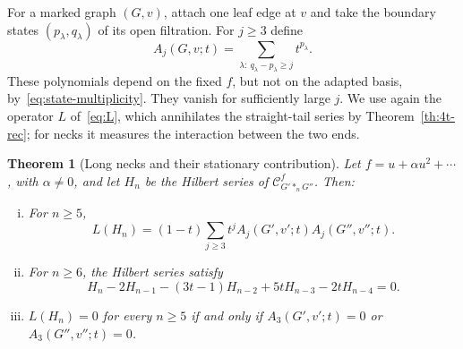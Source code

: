 \documentclass[reqno]{article}
\theoremstyle{plain} %
\newtheorem{theorem}{Theorem}[section]
\theoremstyle{definition}
\theoremstyle{remark}
\newcommand {\CC}{\mathscr{C}}
\numberwithin{equation}{section}
\begin{document}
For a marked graph \((G,v)\), attach one leaf edge at \(v\) and take
the boundary states \((p_\lambda,q_\lambda)\) of its open filtration.
For \(j\ge3\) define
\begin{equation}
\label{eq:boundary-gap-polynomial}
A_j(G,v;t)=
\sum_{\lambda:\ q_\lambda-p_\lambda\ge j}t^{p_\lambda}.
\end{equation}
These polynomials depend on the fixed \(f\), but not on the adapted
basis, by~\eqref{eq:state-multiplicity}. They vanish for sufficiently
large \(j\). We use again the operator \(L\) of~\eqref{eq:L}, which
annihilates the straight-tail series by Theorem~\ref{th:4t-rec}; for
necks it measures the interaction between the two ends.

\begin{theorem}[Long necks and their stationary contribution]
\label{thm:longneck}
Let $f=u+\alpha u^2+\cdots$, with $\alpha\ne0$, and let $H_n$ be the Hilbert
series of $\CC^f_{G'\ast_nG''}$. Then:
\begin{enumerate}[(i)]
\item For $n\ge5$,
\begin{equation}\label{eq:neck-constant}
L(H_n)=(1-t)\sum_{j\ge3}t^j A_j(G',v';t)A_j(G'',v'';t).
\end{equation}
\item For $n\ge6$, the Hilbert series satisfy
\begin{equation}\label{eq:5t-rec}
H_n-2H_{n-1}-(3t-1)H_{n-2}+5tH_{n-3}-2tH_{n-4}=0.
\end{equation}
\item $L(H_n)=0$ for every $n\ge5$ if and only if
$A_3(G',v';t)=0$ or $A_3(G'',v'';t)=0$.
\end{enumerate}
\end{theorem}
\end{document}

